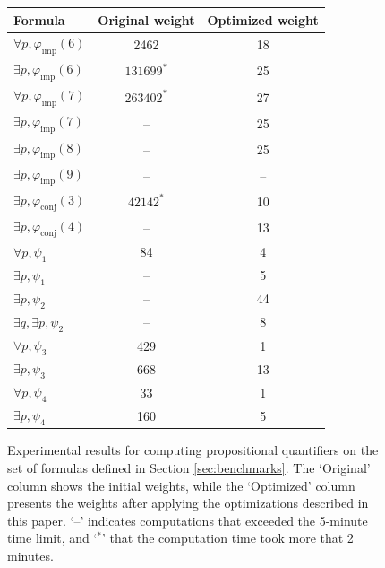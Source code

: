 \documentclass[english,final]{jflart}
\theoremstyle{definition}
\theoremstyle{plain}
\renewcommand{\phi}{\varphi}
\begin{document}
\begin{figure}[htp]
	\centering
	\begin{tabular}{|l||c|c|}
		\hline
		Formula                             & Original weight & Optimized weight \\
		\hline
		$\forall p, \phi_{\text{imp}} (6)$  & 2462            & 18               \\
		$\exists p, \phi_{\text{imp}} (6)$  & $131699^*$      & 25               \\
		$\forall p, \phi_{\text{imp}} (7)$  & $263402^*$      & 27               \\
		$\exists p, \phi_{\text{imp}} (7)$  & --              & 25               \\
		$\exists p, \phi_{\text{imp}} (8)$  & --              & 25               \\
		$\exists p, \phi_{\text{imp}} (9)$  & --              & --               \\
		$\exists p, \phi_{\text{conj}} (3)$ & $42142^*$       & 10               \\
		$\exists p, \phi_{\text{conj}} (4)$ & --              & 13               \\
		$\forall p, \psi_1$                 & 84              & 4                \\
		$\exists p, \psi_1$                 & --              & 5                \\
		$\exists p, \psi_2$                 & --              & 44               \\
		$\exists q, \exists p, \psi_2$      & --              & 8                \\
		$\forall p, \psi_3$                 & 429             & 1                \\
		$\exists p, \psi_3$                 & 668             & 13               \\
		$\forall p, \psi_4$                 & 33              & 1                \\
		$\exists p, \psi_4$                 & 160             & 5                \\
		\hline
	\end{tabular}
	\caption{Experimental results for computing propositional quantifiers on the set of formulas defined in Section \ref{sec:benchmarks}. The `Original' column shows the initial weights, while the `Optimized' column presents the weights after applying the optimizations described in this paper. `--' indicates computations that exceeded the 5-minute time limit, and `$^*$' that the computation time took more that 2 minutes.}
	\label{tab:quant-improvements}
\end{figure}
\end{document}
